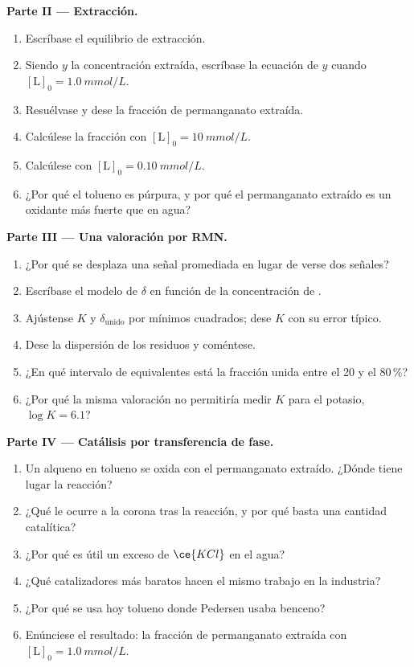 \begin{problem}
\medskip\noindent\textbf{Parte II --- Extracción.}
\begin{enumerate}[resume]
  \item Escríbase el equilibrio de extracción.
  \item Siendo $y$ la concentración extraída, escríbase la ecuación de $y$ cuando
        $[\mathrm L]_0 = \qty{1.0}{mmol/L}$.
  \item Resuélvase y dese la fracción de permanganato extraída.
  \item Calcúlese la fracción con $[\mathrm L]_0 = \qty{10}{mmol/L}$.
  \item Calcúlese con $[\mathrm L]_0 = \qty{0.10}{mmol/L}$.
  \item ¿Por qué el tolueno es púrpura, y por qué el permanganato extraído es un oxidante
        más fuerte que en agua?
\end{enumerate}

\medskip\noindent\textbf{Parte III --- Una valoración por RMN.}
\begin{enumerate}[resume]
  \item ¿Por qué se desplaza una señal promediada en lugar de verse dos señales?
  \item Escríbase el modelo de $\delta$ en función de la concentración de .
  \item Ajústense $K$ y $\delta_{\mathrm{unido}}$ por mínimos cuadrados; dese $K$ con su error típico.
  \item Dese la dispersión de los residuos y coméntese.
  \item ¿En qué intervalo de equivalentes está la fracción unida entre el 20 y el 80\,\%?
  \item ¿Por qué la misma valoración no permitiría medir $K$ para el potasio, $\log K = 6.1$?
\end{enumerate}

\medskip\noindent\textbf{Parte IV --- Catálisis por transferencia de fase.}
\begin{enumerate}[resume]
  \item Un alqueno en tolueno se oxida con el permanganato extraído. ¿Dónde tiene lugar
        la reacción?
  \item ¿Qué le ocurre a la corona tras la reacción, y por qué basta una cantidad
        catalítica?
  \item ¿Por qué es útil un exceso de $\ce{KCl}$ en el agua?
  \item ¿Qué catalizadores más baratos hacen el mismo trabajo en la industria?
  \item ¿Por qué se usa hoy tolueno donde Pedersen usaba benceno?
  \item Enúnciese el resultado: la fracción de permanganato extraída con
        $[\mathrm L]_0 = \qty{1.0}{mmol/L}$.
\end{enumerate}
\end{problem}
